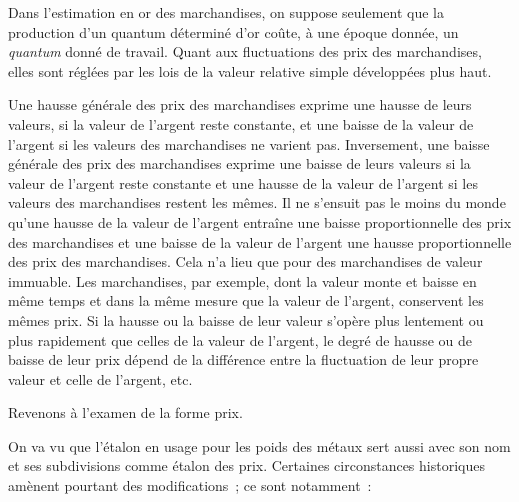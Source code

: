 \documentclass[french,twoside]{book} %
\begin{document}
Dans l’estimation en or des marchandises, on suppose seulement que la production d’un quantum déterminé d’or coûte, à une époque donnée, un \emph{quantum} donné de travail. Quant aux fluctuations des prix des marchandises, elles sont réglées par les lois de la valeur relative simple développées plus haut.\par
Une hausse générale des prix des marchandises exprime une hausse de leurs valeurs, si la valeur de l’argent reste constante, et une baisse de la valeur de l’argent si les valeurs des marchandises ne varient pas. Inversement, une baisse générale des prix des marchandises exprime une baisse de leurs valeurs si la valeur de l’argent reste constante et une hausse de la valeur de l’argent si les valeurs des marchandises restent les mêmes. Il ne s’ensuit pas le moins du monde qu’une hausse de la valeur de l’argent entraîne une baisse proportionnelle des prix des marchandises et une baisse de la valeur de l’argent une hausse proportionnelle des prix des marchandises. Cela n’a lieu que pour des marchandises de valeur immuable. Les marchandises, par exemple, dont la valeur monte et baisse en même temps et dans la même mesure que la valeur de l’argent, conservent les mêmes prix. Si la hausse ou la baisse de leur valeur s’opère plus lentement ou plus rapidement que celles de la valeur de l’argent, le degré de hausse ou de baisse de leur prix dépend de la différence entre la fluctuation de leur propre valeur et celle de l’argent, etc.\par
Revenons à l’examen de la forme prix.\par
On va vu que l’étalon en usage pour les poids des métaux sert aussi avec son nom et ses subdivisions comme étalon des prix. Certaines circonstances historiques amènent pourtant des modifications ; ce sont notamment :\par
\end{document}
